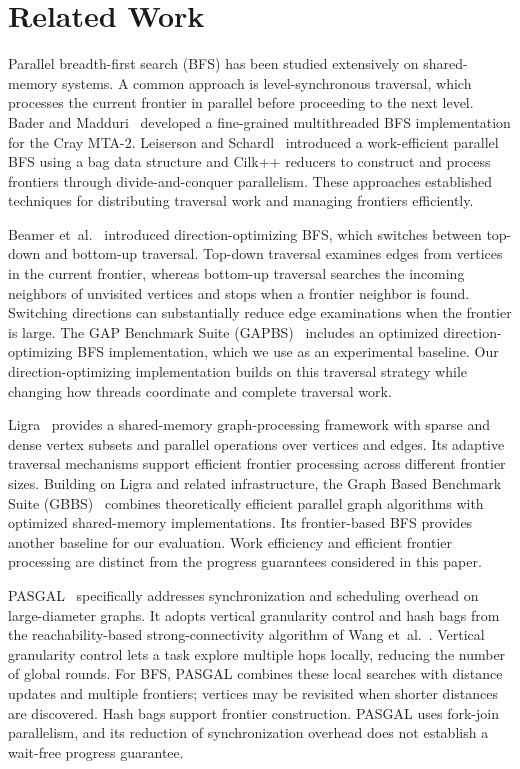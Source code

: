 \section{Related Work}
\label{sec:related}

Parallel breadth-first search (BFS) has been studied extensively on shared-memory systems. A common approach is level-synchronous traversal, which processes the current frontier in parallel before proceeding to the next level. Bader and Madduri~\cite{bader_bfs} developed a fine-grained multithreaded BFS implementation for the Cray MTA-2. Leiserson and Schardl~\cite{charles_bfs} introduced a work-efficient parallel BFS using a bag data structure and Cilk++ reducers to construct and process frontiers through divide-and-conquer parallelism. These approaches established techniques for distributing traversal work and managing frontiers efficiently.

Beamer et~al.~\cite{beamer_dobfs} introduced direction-optimizing BFS, which switches between top-down and bottom-up traversal. Top-down traversal examines edges from vertices in the current frontier, whereas bottom-up traversal searches the incoming neighbors of unvisited vertices and stops when a frontier neighbor is found. Switching directions can substantially reduce edge examinations when the frontier is large. The GAP Benchmark Suite (GAPBS)~\cite{gapbs} includes an optimized direction-optimizing BFS implementation, which we use as an experimental baseline. Our direction-optimizing implementation builds on this traversal strategy while changing how threads coordinate and complete traversal work.

Ligra~\cite{ligra} provides a shared-memory graph-processing framework with sparse and dense vertex subsets and parallel operations over vertices and edges. Its adaptive traversal mechanisms support efficient frontier processing across different frontier sizes. Building on Ligra and related infrastructure, the Graph Based Benchmark Suite (GBBS)~\cite{gbbs} combines theoretically efficient parallel graph algorithms with optimized shared-memory implementations. Its frontier-based BFS provides another baseline for our evaluation. Work efficiency and efficient frontier processing are distinct from the progress guarantees considered in this paper.

PASGAL~\cite{pasgal} specifically addresses synchronization and scheduling overhead on large-diameter graphs. It adopts vertical granularity control and hash bags from the reachability-based strong-connectivity algorithm of Wang et~al.~\cite{vgc_hashbag}. Vertical granularity control lets a task explore multiple hops locally, reducing the number of global rounds. For BFS, PASGAL combines these local searches with distance updates and multiple frontiers; vertices may be revisited when shorter distances are discovered. Hash bags support frontier construction. PASGAL uses fork-join parallelism, and its reduction of synchronization overhead does not establish a wait-free progress guarantee.

